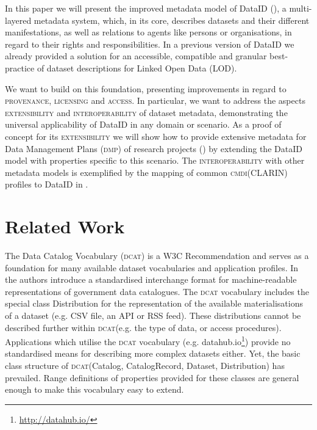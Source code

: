\documentclass[runningheads,a4paper]{llncs}
\newcommand{\provenance}{{\scshape provenance}\xspace}
\newcommand{\licensing}{{\scshape licensing}\xspace}
\newcommand{\access}{{\scshape access}\xspace}
\newcommand{\extensibility}{{\scshape extensibility}\xspace}
\newcommand{\interoperability}{{\scshape interoperability}\xspace}
\newcommand{\cmdi}{{\scshape cmdi}\xspace}
\newcommand{\dcat}{{\scshape dcat}\xspace}
\newcommand{\dmp}{{\scshape dmp}\xspace}
\newcommand\footnoteurl[1]{\footnote{\scriptsize\url{#1}}}
\begin{document}
In this paper we will present the improved metadata model of DataID (), a multi-layered metadata system, which, in its core, describes datasets and their different manifestations, as well as relations to agents like persons or organisations, in regard to their rights and responsibilities.
In a previous version of DataID\cite{dataID2014} we already provided a solution for an accessible, compatible and granular best-practice of dataset descriptions for Linked Open Data (LOD).

We want to build on this foundation, presenting improvements in regard to \provenance, \licensing and \access. In particular, we want to address the aspects \extensibility and \interoperability of dataset metadata, demonstrating the universal applicability of DataID in any domain or scenario.
As a proof of concept for its \extensibility we will show how to provide extensive metadata for Data Management Plans (\dmp) of research projects () by extending the DataID model with properties specific to this scenario.
The \interoperability with other metadata models is exemplified by the mapping of common \cmdi (CLARIN) profiles to DataID in .

\section{Related Work}
\label{related}
The Data Catalog Vocabulary (\dcat) is a W3C Recommendation \cite{ddcat} and serves as a foundation for many available dataset vocabularies and application profiles.
In \cite{MaaliCP10} the authors introduce a standardised interchange format for machine-readable representations of government data catalogues.
The \dcat vocabulary includes the special class Distribution
for the representation of the available materialisations of a
dataset (e.g. CSV file, an API or RSS feed). These distributions cannot be described further within \dcat (e.g. the type of data, or access procedures).
Applications which utilise the \dcat vocabulary (e.g. datahub.io\footnoteurl{http://datahub.io/}) provide no standardised means for describing more complex datasets either.
Yet, the basic class structure of \dcat (Catalog, CatalogRecord, Dataset, Distribution) has prevailed. Range definitions of properties provided for these classes are general enough to make this vocabulary easy to extend.
\end{document}
